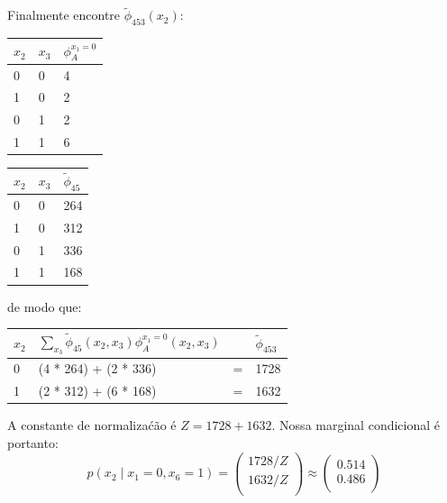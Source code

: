 \begin{exenumerate}
\begin{solution}
        Finalmente encontre $\tilde{\phi}_{453}(x_2)$:
        \begin{center}
            \begin{tabular}{lll}
                \toprule
                $x_2$ & $x_3$ & $\phi_A^{x_1=0}$\\
                \midrule
                0 & 0 & 4 \\
                1 & 0 & 2 \\
                0 & 1 & 2 \\
                1 & 1 & 6 \\
                \bottomrule
            \end{tabular}\hspace{2ex}
            \begin{tabular}{lll}
                \toprule
                $x_2$ & $x_3$ & $\tilde{\phi}_{45}$\\
                \midrule
                0 & 0 & 264 \\
                1 & 0 & 312 \\
                0 & 1 & 336 \\
                1 & 1 & 168 \\
                \bottomrule
            \end{tabular}
        \end{center}
        de modo que:
        \begin{center}
            \begin{tabular}{llll}
                \toprule
                $x_2$ & $\sum_{x_3} \tilde{\phi}_{45}(x_2, x_3) \phi_A^{x_1=0}(x_2,x_3)$  &  & $\tilde{\phi}_{453}$\\
                \midrule
                0 & (4 * 264) + (2 * 336) & = & 1728 \\
                1 & (2 * 312) + (6 * 168) & = & 1632 \\
                \bottomrule
            \end{tabular}
        \end{center}\vspace{1ex}
        
        A constante de normaliza\'c\~ao \'e $Z = 1728 + 1632$. Nossa marginal condicional \'e portanto:
        \begin{equation}
            p(x_2 \mid x_1=0, x_6=1) = 
            \begin{pmatrix}
                1728 / Z \\
                1632 / Z \\
            \end{pmatrix} \approx 
            \begin{pmatrix}
                0.514 \\
                0.486 \\
            \end{pmatrix}
        \end{equation}
        

\end{solution}
\end{exenumerate}
